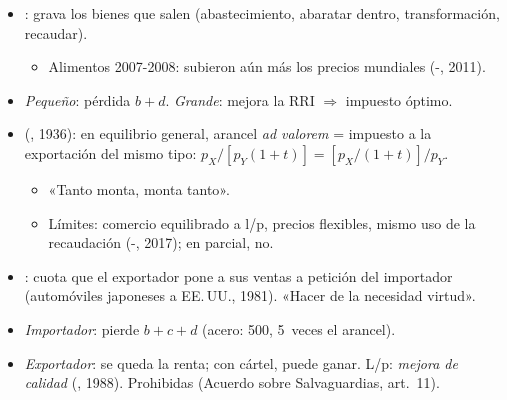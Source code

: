 \documentclass{article}
\begin{document}
\begin{columnas}
\begin{itemize}
\item {}: grava los bienes que salen (abastecimiento, abaratar dentro, transformación, recaudar).
  \begin{itemize}
  \item Alimentos 2007-2008: subieron aún más los precios mundiales (-, 2011).
  \end{itemize}
\item \emph{Pequeño}: pérdida $b+d$. \emph{Grande}: mejora la RRI $\Rightarrow$ impuesto óptimo.
\item {} (, 1936): en equilibrio general, arancel \emph{ad valorem} = impuesto a la exportación del mismo tipo: $p_X/[p_Y(1+t)]=[p_X/(1+t)]/p_Y$.
  \begin{itemize}
  \item «Tanto monta, monta tanto».
  \item Límites: comercio equilibrado a l/p, precios flexibles, mismo uso de la recaudación (-, 2017); en parcial, no.
  \end{itemize}
\end{itemize}

\begin{itemize}
\item {}: cuota que el exportador pone a sus ventas a petición del importador (automóviles japoneses a EE.\,UU., 1981). «Hacer de la necesidad virtud».
\item \emph{Importador}: pierde $b+c+d$ (acero: 500, 5~veces el arancel).
\item \emph{Exportador}: se queda la renta; con cártel, puede ganar. L/p: \emph{mejora de calidad} (, 1988). Prohibidas (Acuerdo sobre Salvaguardias, art.~11).
\end{itemize}


\end{columnas}
\end{document}
